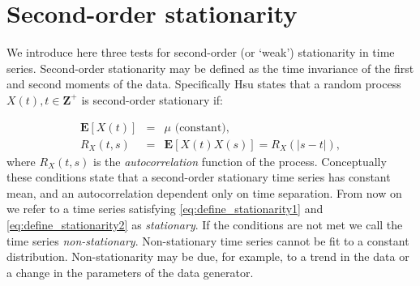 % 
% 




\section{Second-order stationarity}
\label{sec:stationarity}



We introduce here three tests for second-order (or `weak') stationarity in time series.  Second-order stationarity may be defined as the time invariance of the first and second moments of the data. Specifically Hsu \cite{hsu1997schaum} states that a random process $X(t), t \in \mathbf{Z}^+$ is second-order stationary if:

\begin{eqnarray}
	\mathbf{E}[X(t)] &=& \mu \text{ (constant),}\label{eq:define_stationarity1}\\
	R_X(t,s) &=& \mathbf{E}[X(t)X(s)] = R_X(|s-t|),\label{eq:define_stationarity2}
\end{eqnarray}
%
where $R_X(t,s)$ is the \emph{autocorrelation} function of the process. Conceptually these conditions state that a second-order stationary time series has constant mean, and an autocorrelation dependent only on time separation. From now on we refer to a time series satisfying \eqref{eq:define_stationarity1} and \eqref{eq:define_stationarity2} as \emph{stationary}. If the conditions are not met we call the time series \emph{non-stationary}. Non-stationary time series cannot be fit to a constant distribution. Non-stationarity may be due, for example, to a trend in the data or a change in the parameters of the data generator.

